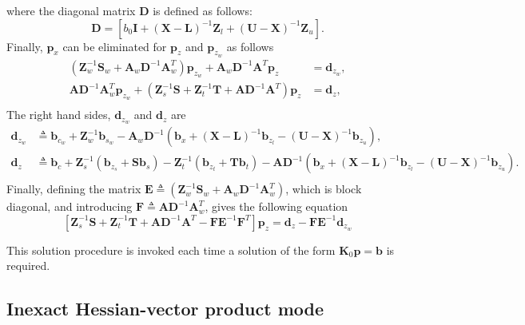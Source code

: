 \documentclass[12pt]{article}
\newcommand{\mb}{\mathbf}
\begin{document}
where the diagonal matrix $\mb{D}$ is defined as follows:
\begin{equation*}
  \mb{D} = \left[ b_{0} \mb{I} + (\mb{X} - \mb{L})^{-1}\mb{Z}_{l} + (\mb{U} - \mb{X})^{-1}\mb{Z}_{u} \right].
\end{equation*}
%
Finally, $\mb{p}_{x}$ can be eliminated for $\mb{p}_{z}$ and $\mb{p}_{z_{w}}$ as follows
\begin{equation}
  \begin{aligned}
    (\mb{Z}_{w}^{-1}\mb{S}_{w} + \mb{A}_{w}\mb{D}^{-1}\mb{A}_{w}^{T})\mb{p}_{z_{w}} + \mb{A}_{w}\mb{D}^{-1}\mb{A}^{T}\mb{p}_{z} &= \mb{d}_{z_{w}}, \\
    \mb{A}\mb{D}^{-1}\mb{A}_{w}^{T} \mb{p}_{z_{w}} + (\mb{Z}_{s}^{-1}\mb{S} + \mb{Z}_{t}^{-1}\mb{T} + \mb{A}\mb{D}^{-1}\mb{A}^{T})\mb{p}_{z} &= \mb{d}_{z}, \\
  \end{aligned}
\end{equation}
%
The right hand sides, $\mb{d}_{z_{w}}$ and $\mb{d}_{z}$ are
\begin{equation*}
  \begin{aligned}
    \mb{d}_{z_{w}} &\triangleq \mb{b}_{c_{w}} + \mb{Z}_{w}^{-1}\mb{b}_{s_{w}} - \mb{A}_{w}\mb{D}^{-1}\left(\mb{b}_{x} + (\mb{X} - \mb{L})^{-1}\mb{b}_{z_{l}} - (\mb{U} - \mb{X})^{-1}\mb{b}_{z_{u}} \right), \\
    \mb{d}_{z} &\triangleq \mb{b}_{c} + \mb{Z}_{s}^{-1}(\mb{b}_{z_{s}} + \mb{S}\mb{b}_{s}) - \mb{Z}_{t}^{-1}(\mb{b}_{z_{t}} + \mb{T}\mb{b}_{t}) - \mb{A}\mb{D}^{-1}\left(\mb{b}_{x} + (\mb{X} - \mb{L})^{-1}\mb{b}_{z_{l}} - (\mb{U} - \mb{X})^{-1}\mb{b}_{z_{u}} \right). \\
  \end{aligned}
\end{equation*}
%
Finally, defining the matrix $\mb{E} \triangleq (\mb{Z}_{w}^{-1}\mb{S}_{w} + \mb{A}_{w}\mb{D}^{-1}\mb{A}_{w}^{T})$, which is block diagonal, and introducing $\mb{F} \triangleq \mb{A}\mb{D}^{-1}\mb{A}_{w}^{T}$, gives the following equation
\begin{equation*}
  \left[\mb{Z}_{s}^{-1}\mb{S} + \mb{Z}_{t}^{-1}\mb{T} + \mb{A}\mb{D}^{-1}\mb{A}^{T} - \mb{F}\mb{E}^{-1}\mb{F}^{T} \right]\mb{p}_{z} = \mb{d}_{z} - \mb{F}\mb{E}^{-1} \mb{d}_{z_{w}}
\end{equation*}

This solution procedure is invoked each time a solution of the form $\mb{K}_{0}\mb{p} = \mb{b}$ is required.

\subsection{Inexact Hessian-vector product mode}
\end{document}
